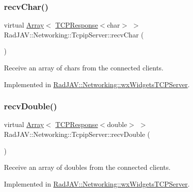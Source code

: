 \subsubsection{\texorpdfstring{recv\+Char()}{recvChar()}}
{\footnotesize\ttfamily virtual \mbox{\hyperlink{class_rad_j_a_v_1_1_array}{Array}}$<$ \mbox{\hyperlink{class_rad_j_a_v_1_1_networking_1_1_t_c_p_response}{T\+C\+P\+Response}}$<$char$>$ $>$ Rad\+J\+A\+V\+::\+Networking\+::\+Tcpip\+Server\+::recv\+Char (\begin{DoxyParamCaption}{ }\end{DoxyParamCaption})\hspace{0.3cm}{\ttfamily [pure virtual]}}



Receive an array of chars from the connected clients. 



Implemented in \mbox{\hyperlink{class_rad_j_a_v_1_1_networking_1_1wx_widgets_t_c_p_server_a260f0b6e48b6d861b42a4f7f31055be7}{Rad\+J\+A\+V\+::\+Networking\+::wx\+Widgets\+T\+C\+P\+Server}}.

\mbox{\label{class_rad_j_a_v_1_1_networking_1_1_tcpip_server_a9be024d5c466e59447ef22a14884a93a}} 
\subsubsection{\texorpdfstring{recv\+Double()}{recvDouble()}}
{\footnotesize\ttfamily virtual \mbox{\hyperlink{class_rad_j_a_v_1_1_array}{Array}}$<$ \mbox{\hyperlink{class_rad_j_a_v_1_1_networking_1_1_t_c_p_response}{T\+C\+P\+Response}}$<$double$>$ $>$ Rad\+J\+A\+V\+::\+Networking\+::\+Tcpip\+Server\+::recv\+Double (\begin{DoxyParamCaption}{ }\end{DoxyParamCaption})\hspace{0.3cm}{\ttfamily [pure virtual]}}



Receive an array of doubles from the connected clients. 



Implemented in \mbox{\hyperlink{class_rad_j_a_v_1_1_networking_1_1wx_widgets_t_c_p_server_ae2e774ab7ab334a0eea09ece7f7f2775}{Rad\+J\+A\+V\+::\+Networking\+::wx\+Widgets\+T\+C\+P\+Server}}.

